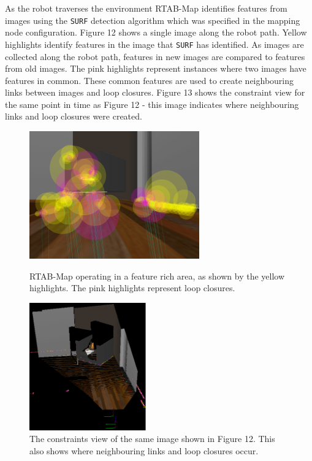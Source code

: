 \documentclass[a4paper]{article}
\begin{document}
As the robot traverses the environment RTAB-Map identifies features from images using the \texttt{SURF} detection algorithm which was specified in the mapping node configuration. Figure 12 shows a single image along the robot path. Yellow highlights identify features in the image that \texttt{SURF} has identified. As images are collected along the robot path, features in new images are compared to features from old images. The pink highlights represent instances where two images have features in common. These common features are used to create neighbouring links between images and loop closures. Figure 13 shows the constraint view for the same point in time as Figure 12 - this image indicates where neighbouring links and loop closures were created.
\begin{figure}[h]
\centering
\begin{minipage}[t]{0.45\textwidth}
\centering
\includegraphics[height=5.5cm]{kitchen_features}
\caption{RTAB-Map operating in a feature rich area, as shown by the yellow highlights. The pink highlights represent loop closures.}
\end{minipage}
\hspace{1cm}
\begin{minipage}[t]{0.45\textwidth}
\centering
\includegraphics[height=5.5cm]{kitchen_constraints}
\caption{The constraints view of the same image shown in Figure 12. This also shows where neighbouring links and loop closures occur.}
\end{minipage}
\end{figure}
\end{document}

